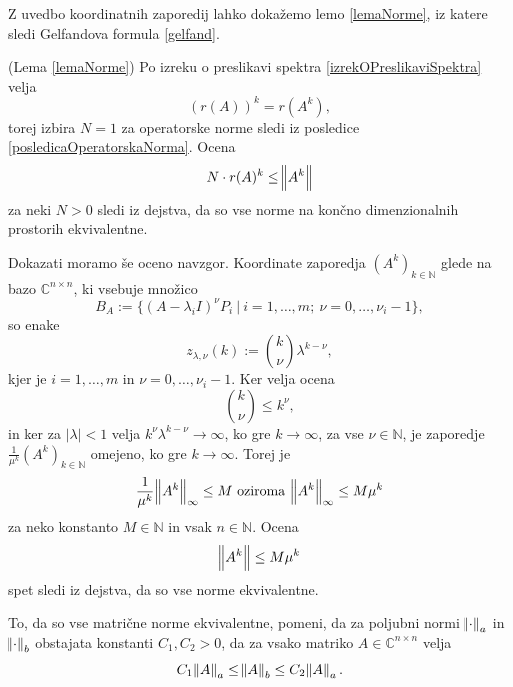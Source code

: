 \documentclass[mat1]{fmfdelo}
\newcommand{\N}{\mathbb N}
\newcommand{\C}{\mathbb C}
\begin{document}
Z uvedbo koordinatnih zaporedij lahko dokažemo lemo \ref{lemaNorme}, iz katere sledi Gelfandova formula \ref{gelfand}.
\begin{dokaz}\label{dokazLemaNorme}
    (Lema \ref{lemaNorme}) Po izreku o preslikavi spektra  \ref{izrekOPreslikaviSpektra} velja
    \begin{equation*}
        \left(r(A)\right)^k = r(A^k),
    \end{equation*}
    torej izbira $N = 1$ za operatorske norme sledi iz posledice \ref{posledicaOperatorskaNorma}. Ocena
    \begin{equation*}
        N \cdot r(A)^k \leq \norm{A^k}
    \end{equation*}
    za neki $N > 0$ sledi iz dejstva, da so vse norme na končno dimenzionalnih prostorih ekvivalentne.

    Dokazati moramo še oceno navzgor. Koordinate zaporedja $(A^k)_{k\in\N}$ glede na bazo $\C^{n \times n}$, ki vsebuje množico
    \begin{equation*}
        B_A := \{(A-\lambda_i I)^{\nu} P_i\ |\ i = 1, \ldots, m;\ \nu = 0, \ldots, \nu_i - 1\},
    \end{equation*}
    so enake
    \begin{equation*}
        z_{\lambda, \nu} (k) := {k \choose \nu} \lambda^{k - \nu},
    \end{equation*}
    kjer je $i = 1, \ldots, m$ in $\nu = 0, \ldots, \nu_i-1$. Ker velja ocena
    \begin{equation*}
        {k \choose \nu} \leq k^\nu,
    \end{equation*}
    in ker za $|\lambda| < 1$ velja $k^\nu \lambda^{k-\nu} \rightarrow \infty$, ko gre $k\rightarrow \infty$, za vse $\nu \in \N$, je zaporedje $\frac{1}{\mu^k}(A^k)_{k\in\N}$ omejeno, ko gre $k\rightarrow \infty$. Torej je
    \begin{equation*}
        \frac{1}{\mu^k} \norm{A^k}_\infty \leq M\ \text{oziroma}\ \norm{A^k}_\infty \leq M \mu^k
    \end{equation*}
    za neko konstanto $M \in \N$ in vsak $n \in \N$. Ocena
    \begin{equation*}
        \norm{A^k} \leq M \mu^k
    \end{equation*}
    spet sledi iz dejstva, da so vse norme ekvivalentne.
\end{dokaz}
\begin{opomba}
    To, da so vse matrične norme ekvivalentne, pomeni, da za poljubni normi $\norm{\cdot}_a$ in $\norm{\cdot}_b$ obstajata konstanti $C_1, C_2 > 0$, da za vsako matriko $A \in \C^{n \times n}$ velja
    \begin{equation*}
        C_1 \norm{A}_a \leq \norm{A}_b \leq C_2 \norm{A}_a.
    \end{equation*}
\end{opomba}
\end{document}
